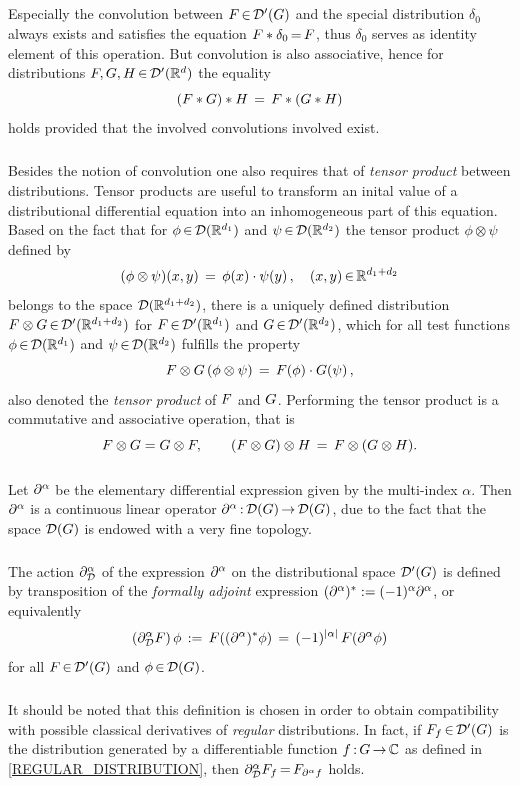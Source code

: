 \documentclass[11pt,twoside]{article}
\begin{document}
\subparagraph{}
Especially the convolution between $F {\,\in\,} {\mathcal{D}}'(G)$
and the special distribution $\delta_0$ always exists and
satisfies the equation $F \ast \delta_0 {\,=\,} F$,
thus $\delta_0$ serves as identity element of this operation.
But convolution is also associative,
hence for distributions $F, G, H {\,\in\,} {\mathcal{D}}'({\mathbb{R}}^d)$ the equality
\[
(F \ast G) \ast H \,=\, F \ast (G \ast H)
\]
holds provided that
the involved convolutions involved exist.

\subparagraph{}
Besides the notion of convolution one also requires
that of \textit{tensor product} between distributions.
Tensor products are useful to transform an inital value
of a distributional differential equation
into an inhomogeneous part of this equation.
Based on the fact
that for $\phi {\,\in\,} {\mathcal{D}}({\mathbb{R}}^{d_1})$ and $\psi {\,\in\,} {\mathcal{D}}({\mathbb{R}}^{d_2})$ 
the tensor product $\phi \otimes \psi$ defined by
\[
(\phi \otimes \psi)(x,y) \,=\, \phi(x) \cdot \psi(y)\,,
\quad (x,y) {\,\in\,} {\mathbb{R}}^{d_1+d_2}
\]
belongs to the space ${\mathcal{D}}({\mathbb{R}}^{d_1+d_2})$,
there is
a uniquely defined distribution
$
F \otimes G {\,\in\,} {\mathcal{D}}'({\mathbb{R}}^{d_1+d_2})
$
for $F {\,\in\,} {\mathcal{D}}'({\mathbb{R}}^{d_1})$ and $G {\,\in\,} {\mathcal{D}}'({\mathbb{R}}^{d_2})$,
which for all test functions
$\phi {\,\in\,} {\mathcal{D}}({\mathbb{R}}^{d_1})$ and $\psi {\,\in\,} {\mathcal{D}}({\mathbb{R}}^{d_2})$
fulfills the property
\[
F \otimes G \, (\phi \otimes \psi)
\,=\, F(\phi) \cdot G(\psi)\,,
\]
also denoted the \textit{tensor product} of $F$ and $G$.
Performing the tensor product is a commutative and associative operation,
that is
\[
F \otimes G = G \otimes F,
\quad \quad
(F \otimes G) \otimes H \,=\,
 F \otimes (G \otimes H).
\]

\subparagraph{}
Let $\partial^{\alpha}$ be the elementary differential expression
given by the multi-index $\alpha$.
Then $\partial^{\alpha}$ is a continuous linear operator $\partial^{\alpha} {\,:\,}{\mathcal{D}}(G) {\,\to\,} {\mathcal{D}}(G)$,
due to the fact
that the space ${\mathcal{D}}(G)$ is endowed with a very fine topology.

\subparagraph{}
The action $\partial^{\alpha}_{{\mathcal{D}}}$ of the expression $\partial^{\alpha}$
on the distributional space ${\mathcal{D}}'(G)$
is defined by transposition of the \textit{formally adjoint} expression
$(\partial^{\alpha})^* := (-1)^{\alpha} \partial^{\alpha}$,
or equivalently
\begin{equation}\label{DISTRIBUTIONAL_DERIVATIVE}
(\PA_{\D} \disF) \, \phi \eqdef \disF((\PA)^* \phi)
\= (-1)^{\abs{\alpha} } \, \disF(\PA \phi)
\end{equation}
for all $F {\,\in\,} {\mathcal{D}}'(G)$ and $\phi {\,\in\,} {\mathcal{D}}(G)$.

\subparagraph{}
It should be noted
that this definition is chosen in order
to obtain compatibility with possible classical derivatives
of \textit{regular} distributions.
In fact,
if $F_f {\,\in\,} {\mathcal{D}}'(G)$ is the distribution generated
by a differentiable function $f {\,:\,}G {\,\to\,} {\mathbb{C}}$
as defined in \eqref{REGULAR_DISTRIBUTION},
then $\partial^{\alpha}_{{\mathcal{D}}} F_f {\,=\,} F_{\partial^{\alpha} f}$ holds.
\end{document}
